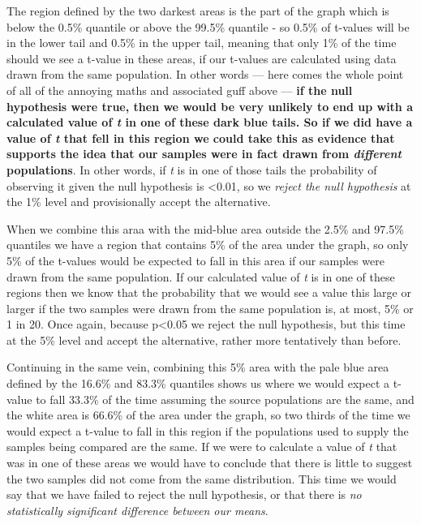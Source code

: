 \documentclass[
]{book}
\begin{document}
The region defined by the two darkest areas is the part of the graph which is below the 0.5\% quantile or above the 99.5\% quantile - so 0.5\% of t-values will be in the lower tail and 0.5\% in the upper tail, meaning that only 1\% of the time should we see a t-value in these areas, if our t-values are calculated using data drawn from the same population. In other words --- here comes the whole point of all of the annoying maths and associated guff above --- \textbf{if the null hypothesis were true, then we would be very unlikely to end up with a calculated value of \emph{t} in one of these dark blue tails. So if we did have a value of \emph{t} that fell in this region we could take this as evidence that supports the idea that our samples were in fact drawn from \emph{different} populations}. In other words, if \emph{t} is in one of those tails the probability of observing it given the null hypothesis is \textless0.01, so we \emph{reject the null hypothesis} at the 1\% level and provisionally accept the alternative.

When we combine this araa with the mid-blue area outside the 2.5\% and 97.5\% quantiles we have a region that contains 5\% of the area under the graph, so only 5\% of the t-values would be expected to fall in this area if our samples were drawn from the same population. If our calculated value of \emph{t} is in one of these regions then we know that the probability that we would see a value this large or larger if the two samples were drawn from the same population is, at most, 5\% or 1 in 20. Once again, because p\textless0.05 we reject the null hypothesis, but this time at the 5\% level and accept the alternative, rather more tentatively than before.

Continuing in the same vein, combining this 5\% area with the pale blue area defined by the 16.6\% and 83.3\% quantiles shows us where we would expect a t-value to fall 33.3\% of the time assuming the source populations are the same, and the white area is 66.6\% of the area under the graph, so two thirds of the time we would expect a t-value to fall in this region if the populations used to supply the samples being compared are the same. If we were to calculate a value of \emph{t} that was in one of these areas we would have to conclude that there is little to suggest the two samples did not come from the same distribution. This time we would say that we have failed to reject the null hypothesis, or that there is \emph{no statistically significant difference between our means}.
\end{document}
